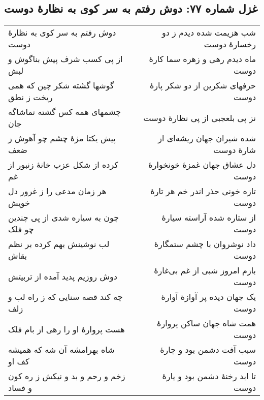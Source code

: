 \begin{center}
\section*{غزل شماره ۷۷: دوش رفتم به سر کوی به نظارهٔ دوست}
\label{sec:077}
\begin{longtable}{l p{0.5cm} r}
دوش رفتم به سر کوی به نظارهٔ دوست
&&
شب هزیمت شده دیدم ز دو رخسارهٔ دوست
\\
از پی کسب شرف پیش بناگوش و لبش
&&
ماه دیدم رهی و زهره سما کارهٔ دوست
\\
گوشها گشته شکر چین که همی ریخت ز نطق
&&
حرفهای شکرین از دو شکر پارهٔ دوست
\\
چشمهای همه کس گشته تماشاگه جان
&&
نز پی بلعجبی از پی نظارهٔ دوست
\\
پیش یکتا مژهٔ چشم چو آهوش ز ضعف
&&
شده شیران جهان ریشه‌ای از شارهٔ دوست
\\
کرده از شکل عزب خانهٔ زنبور از غم
&&
دل عشاق جهان غمزهٔ خونخوارهٔ دوست
\\
هر زمان مدعی را ز غرور دل خویش
&&
تازه خونی حذر اندر خم هر تارهٔ دوست
\\
چون به سیاره شدی از پی چندین چو فلک
&&
از ستاره شده آراسته سیارهٔ دوست
\\
لب نوشینش بهم کرده بر نظم بقاش
&&
داد نوشروان با چشم ستمگارهٔ دوست
\\
دوش روزیم پدید آمده از تربیتش
&&
بازم امروز شبی از غم بی‌غارهٔ دوست
\\
چه کند قصه سنایی که ز راه لب و زلف
&&
یک جهان دیده پر آوازهٔ آوارهٔ دوست
\\
هست پروارهٔ او را رهی از بام فلک
&&
همت شاه جهان ساکن پروارهٔ دوست
\\
شاه بهرامشه آن شه که همیشه کف او
&&
سبب آفت دشمن بود و چارهٔ دوست
\\
زخم و رحم و بد و نیکش ز ره کون و فساد
&&
تا ابد رخنهٔ دشمن بود و یارهٔ دوست
\\
\end{longtable}
\end{center}
